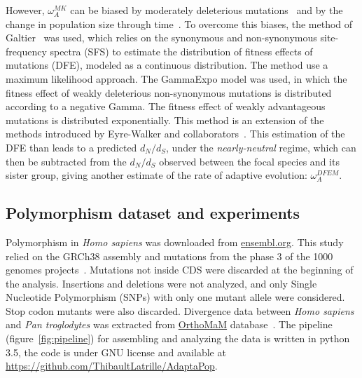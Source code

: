 \documentclass{article}
\begin{document}
However, $\omega_A^{MK}$ can be biased by moderately deleterious mutations~\citep{eyre-walker_quantifying_2002} and by the change in population size through time~\citep{eyre-walker_changing_2002}.
To overcome this biases, the method of Galtier~\citep{Galtier2016} was used, which relies on the synonymous and non-synonymous site-frequency spectra (SFS) to estimate the distribution of fitness effects of mutations (DFE), modeled as a continuous distribution.
The method use a maximum likelihood approach.
The GammaExpo model was used, in which the fitness effect of weakly deleterious non-synonymous mutations is distributed according to a negative Gamma.
The fitness effect of weakly advantageous mutations is distributed exponentially.
This method is an extension of the methods introduced by Eyre-Walker and collaborators~\citep{eyre-walker_distribution_2006, eyre-walker_estimating_2009}.
This estimation of the DFE than leads to a predicted $d_N/d_S$, under the \textit{nearly-neutral} regime, which can then be subtracted from the $d_N/d_S$ observed between the focal species and its sister group, giving another estimate of the rate of adaptive evolution: $\omega_A^{DFEM}$.
\subsection*{Polymorphism dataset and experiments}

Polymorphism in \textit{Homo sapiens} was downloaded from \href{http://www.ensembl.org/index.html}{ensembl.org}.
This study relied on the GRCh38 assembly and mutations from the phase 3 of the 1000 genomes projects~\citep{consortium_integrated_2012, the_1000_genomes_project_consortium_global_2015}.
Mutations not inside CDS were discarded at the beginning of the analysis.
Insertions and deletions were not analyzed, and only Single Nucleotide Polymorphism (SNPs) with only one mutant allele were considered.
Stop codon mutants were also discarded.
Divergence data between \textit{Homo sapiens} and \textit{Pan troglodytes} was extracted from \href{http://www.orthomam.univ-montp2.fr}{OrthoMaM} database~\citep{Ranwez2007, Douzery2014, Scornavacca2019}.
The pipeline (figure~\ref{fig:pipeline}) for assembling and analyzing the data is written in python 3.5, the code is under GNU license and available at \href{https://github.com/ThibaultLatrille/AdaptaPop}{https://github.com/ThibaultLatrille/AdaptaPop}.
\end{document}
